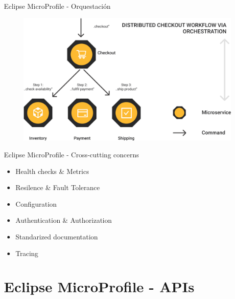 \documentclass[aspectratio=169]{beamer}
\begin{document}
\begin{frame}{Eclipse MicroProfile - Orquestación}
\begin{figure}
	\centering
	\includegraphics[width=0.8\linewidth]{Images/mporch}
\end{figure}
\end{frame}

\begin{frame}{Eclipse MicroProfile - Cross-cutting concerns}

\begin{itemize}
	\item Health checks \& Metrics
	\item Resilence \& Fault Tolerance
	\item Configuration
	\item Authentication \& Authorization
	\item Standarized documentation
    \item Tracing
\end{itemize}

\end{frame}


{
    \section{Eclipse MicroProfile - APIs}
}
\end{document}
